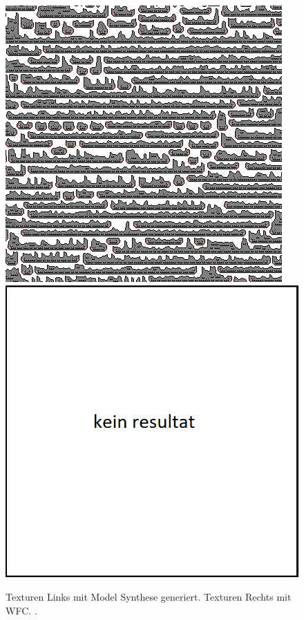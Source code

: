 \documentclass[12pt, a4paper,twoside,openright]{report} %
\begin{document}
\begin{figure}[H]
    \vspace{1em}
    \includegraphics[width=0.45\linewidth]{images/wfc-model-comparison/cat-model.png}%
    \qquad
    \includegraphics[width=0.45\linewidth]{images/wfc-model-comparison/kein-resultat.png}%
    \caption{Texturen Links mit Model Synthese generiert. Texturen Rechts mit WFC. \cite[S.13]{merrell2018compare}.}%
\end{figure}
\end{document}
